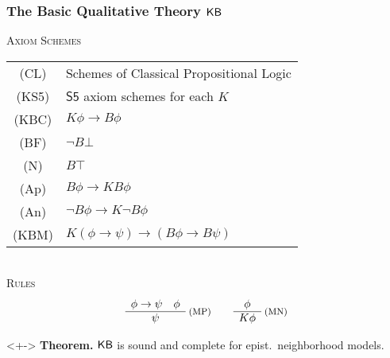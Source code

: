 \begin{frame}
  \frametitle{The Basic Qualitative Theory ${\mathsf{KB}}$}
  \vspace{-1em}\uncover<+->{}\begin{center}
    \small
    \textsc{Axiom Schemes}\\[.4em]
    \renewcommand{\arraystretch}{1.3}
    \begin{tabular}[t]{cl}
      (CL) &
      Schemes of Classical Propositional Logic
      \\
      (KS5) &
      $\mathsf{S5}$ axiom schemes for each $K$
      \\
      (KBC) &
      $K\phi\to B\phi$
      \\
      (BF) &
      $\lnot B\bot$
      \\
      (N) &
      $B\top$
      \\
      (Ap) &
      $B\phi\to KB\phi$
      \\
      (An) &
      $\lnot B\phi\to K\lnot B\phi$
      \\
      (KBM) &
      $K(\phi\to\psi)\to(B\phi\to B\psi)$
    \end{tabular}
    \renewcommand{\arraystretch}{1.0}
    \\[1em]
    \textsc{Rules}\vspace{-.5em}
    \[
    \begin{array}{c}
      \phi\to\psi \quad \phi
      \\\hline
      \psi
    \end{array}\;\text{\footnotesize(MP)}
    \qquad
    \begin{array}{c}
      \phi
      \\\hline
      K\phi
    \end{array}\;\text{\footnotesize(MN)}
    \]
  \end{center}

  \begin{myboxy}<+->
    \textbf{Theorem.} ${\mathsf{KB}}$ is sound and complete for
    epist.~neighborhood models.
  \end{myboxy}

\end{frame}

